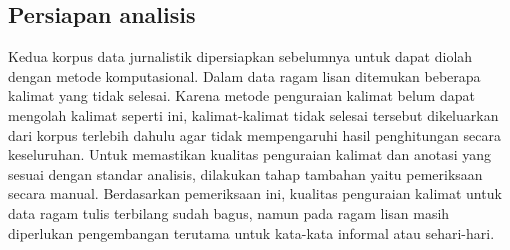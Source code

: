 \subsection{Persiapan analisis}
Kedua korpus data jurnalistik dipersiapkan sebelumnya untuk dapat diolah dengan metode komputasional. Dalam data ragam lisan ditemukan beberapa kalimat yang tidak selesai. Karena metode penguraian kalimat belum dapat mengolah kalimat seperti ini, kalimat-kalimat tidak selesai tersebut dikeluarkan dari korpus terlebih dahulu agar tidak mempengaruhi hasil penghitungan secara keseluruhan. Untuk memastikan kualitas penguraian kalimat dan anotasi yang sesuai dengan standar analisis, dilakukan tahap tambahan yaitu pemeriksaan secara manual. Berdasarkan pemeriksaan ini, kualitas penguraian kalimat untuk data ragam tulis terbilang sudah bagus, namun pada ragam lisan masih diperlukan pengembangan terutama untuk kata-kata informal atau sehari-hari. 

